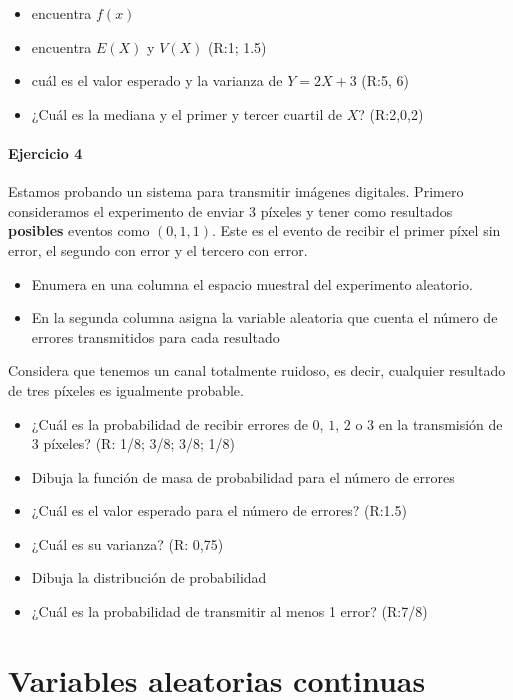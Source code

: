 \documentclass[
]{book}
\providecommand{\tightlist}{%
  \setlength{\itemsep}{0pt}\setlength{\parskip}{0pt}}
\begin{document}
\begin{itemize}
\tightlist
\item
  encuentra \(f(x)\)
\item
  encuentra \(E(X)\) y \(V(X)\) (R:1; 1.5)
\item
  cuál es el valor esperado y la varianza de \(Y=2X+3\) (R:5, 6)
\item
  ¿Cuál es la mediana y el primer y tercer cuartil de \(X\)? (R:2,0,2)
\end{itemize}

\hypertarget{ejercicio-4-1}{%
\subsubsection{Ejercicio 4}\label{ejercicio-4-1}}

Estamos probando un sistema para transmitir imágenes digitales. Primero consideramos el experimento de enviar \(3\) píxeles y tener como resultados \textbf{posibles} eventos como \((0,1,1)\). Este es el evento de recibir el primer píxel sin error, el segundo con error y el tercero con error.

\begin{itemize}
\item
  Enumera en una columna el espacio muestral del experimento aleatorio.
\item
  En la segunda columna asigna la variable aleatoria que cuenta el número de errores transmitidos para cada resultado
\end{itemize}

Considera que tenemos un canal totalmente ruidoso, es decir, cualquier resultado de tres píxeles es igualmente probable.

\begin{itemize}
\item
  ¿Cuál es la probabilidad de recibir errores de \(0\), \(1\), \(2\) o \(3\) en la transmisión de \(3\) píxeles? (R: 1/8; 3/8; 3/8; 1/8)
\item
  Dibuja la función de masa de probabilidad para el número de errores
\item
  ¿Cuál es el valor esperado para el número de errores? (R:1.5)
\item
  ¿Cuál es su varianza? (R: 0,75)
\item
  Dibuja la distribución de probabilidad
\item
  ¿Cuál es la probabilidad de transmitir al menos 1 error? (R:7/8)
\end{itemize}

\hypertarget{variables-aleatorias-continuas}{%
\chapter{Variables aleatorias continuas}\label{variables-aleatorias-continuas}}
\end{document}
